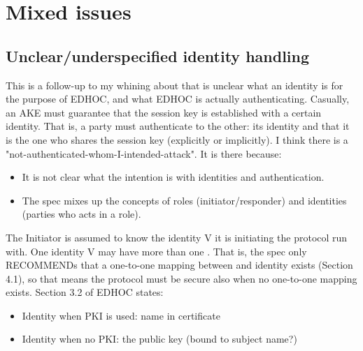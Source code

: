 \section{Mixed issues}
%
\subsection{Unclear/underspecified identity handling}
\label{sec:mail-notes-identity}
%
This is a follow-up to my whining about that is unclear what an identity is
for the purpose of EDHOC, and what EDHOC is actually authenticating.
%
Casually, an AKE must guarantee that the session key is established with a
certain identity.
%
That is, a party must authenticate to the other: its identity and that it is
the one who shares the session key (explicitly or implicitly).
%
I think there is a "not-authenticated-whom-I-intended-attack".
%
It is there because:
\begin{itemize}
    \item It is not clear what the intention is with identities and
            authentication.
    \item The spec mixes up the concepts of roles (initiator/responder) and
        identities (parties who acts in a role).
\end{itemize}
%
The Initiator is assumed to know the identity V it is initiating the protocol
run with.
%
One identity V may have more than one .
%
That is, the spec only RECOMMENDs that a one-to-one mapping between
and identity exists (Section 4.1), so that means the protocol must be secure
also when no one-to-one mapping exists.
%
Section 3.2 of EDHOC states:
\begin{itemize}
    \item Identity when PKI is used: name in certificate
    \item Identity when no PKI: the public key (bound to subject name?)
\end{itemize}

